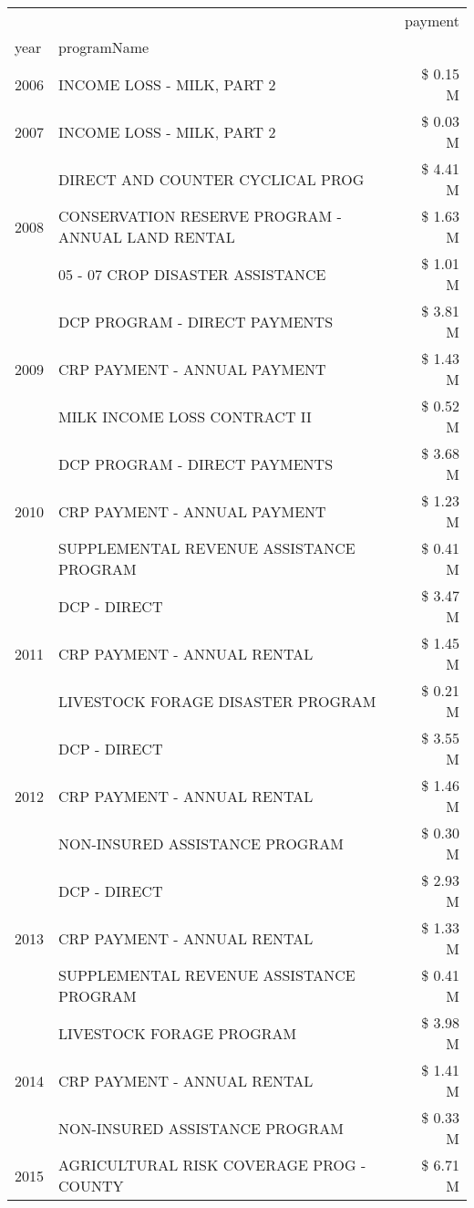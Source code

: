 \begin{tabular}{llr}
\toprule
 &  & payment \\
year & programName &  \\
\midrule
2006 & INCOME LOSS - MILK, PART 2 & \$ 0.15 M \\
\cline{1-3}
2007 & INCOME LOSS - MILK, PART 2 & \$ 0.03 M \\
\cline{1-3}
\multirow[t]{3}{*}{2008} & DIRECT AND COUNTER CYCLICAL PROG & \$ 4.41 M \\
 & CONSERVATION RESERVE PROGRAM - ANNUAL LAND RENTAL & \$ 1.63 M \\
 & 05 - 07 CROP DISASTER ASSISTANCE & \$ 1.01 M \\
\cline{1-3}
\multirow[t]{3}{*}{2009} & DCP PROGRAM - DIRECT PAYMENTS & \$ 3.81 M \\
 & CRP PAYMENT - ANNUAL PAYMENT & \$ 1.43 M \\
 & MILK INCOME LOSS CONTRACT II & \$ 0.52 M \\
\cline{1-3}
\multirow[t]{3}{*}{2010} & DCP PROGRAM - DIRECT PAYMENTS & \$ 3.68 M \\
 & CRP PAYMENT - ANNUAL PAYMENT & \$ 1.23 M \\
 & SUPPLEMENTAL REVENUE ASSISTANCE PROGRAM & \$ 0.41 M \\
\cline{1-3}
\multirow[t]{3}{*}{2011} & DCP - DIRECT & \$ 3.47 M \\
 & CRP PAYMENT - ANNUAL RENTAL & \$ 1.45 M \\
 & LIVESTOCK FORAGE DISASTER PROGRAM & \$ 0.21 M \\
\cline{1-3}
\multirow[t]{3}{*}{2012} & DCP - DIRECT & \$ 3.55 M \\
 & CRP PAYMENT - ANNUAL RENTAL & \$ 1.46 M \\
 & NON-INSURED ASSISTANCE PROGRAM & \$ 0.30 M \\
\cline{1-3}
\multirow[t]{3}{*}{2013} & DCP - DIRECT & \$ 2.93 M \\
 & CRP PAYMENT - ANNUAL RENTAL & \$ 1.33 M \\
 & SUPPLEMENTAL REVENUE ASSISTANCE PROGRAM & \$ 0.41 M \\
\cline{1-3}
\multirow[t]{3}{*}{2014} & LIVESTOCK FORAGE PROGRAM & \$ 3.98 M \\
 & CRP PAYMENT - ANNUAL RENTAL & \$ 1.41 M \\
 & NON-INSURED ASSISTANCE PROGRAM & \$ 0.33 M \\
\cline{1-3}
\multirow[t]{3}{*}{2015} & AGRICULTURAL RISK COVERAGE PROG - COUNTY & \$ 6.71 M \\

\end{tabular}
